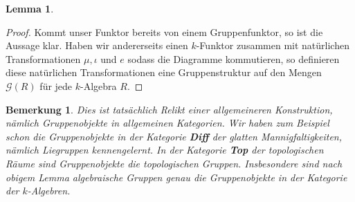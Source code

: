 \documentclass[a4paper, 11pt]{scrartcl}
\newcommand{\id}{\text{id}}
\theoremstyle{basicstyle}
\newtheorem{bemerkung}[definition]{Bemerkung}
\newtheorem{lemma}[definition]{Lemma}
\begin{document}
\begin{lemma}
\begin{figure*}[ht!]
\hspace*{4em}
        \end{figure*}
    \end{lemma}

    \begin{proof}
        Kommt unser Funktor bereits von einem Gruppenfunktor, so ist die Aussage klar.
        Haben wir andererseits einen \(k\)-Funktor zusammen mit natürlichen Transformationen \(\mu, \iota\) und \(e\) sodass die Diagramme kommutieren, so definieren diese natürlichen Transformationen eine Gruppenstruktur auf den Mengen \(\mathcal{G}(R)\) für jede \(k\)-Algebra \(R\).
    \end{proof}

    \begin{bemerkung}
        Dies ist tatsächlich Relikt einer allgemeineren Konstruktion, nämlich Gruppenobjekte in allgemeinen Kategorien.
        Wir haben zum Beispiel schon die Gruppenobjekte in der Kategorie \textbf{Diff} der glatten Mannigfaltigkeiten, nämlich Liegruppen kennengelernt.
        In der Kategorie \textbf{Top} der topologischen Räume sind Gruppenobjekte die topologischen Gruppen.
        Insbesondere sind nach obigem Lemma algebraische Gruppen genau die Gruppenobjekte in der Kategorie der \(k\)-Algebren.
    \end{bemerkung}
\end{document}
